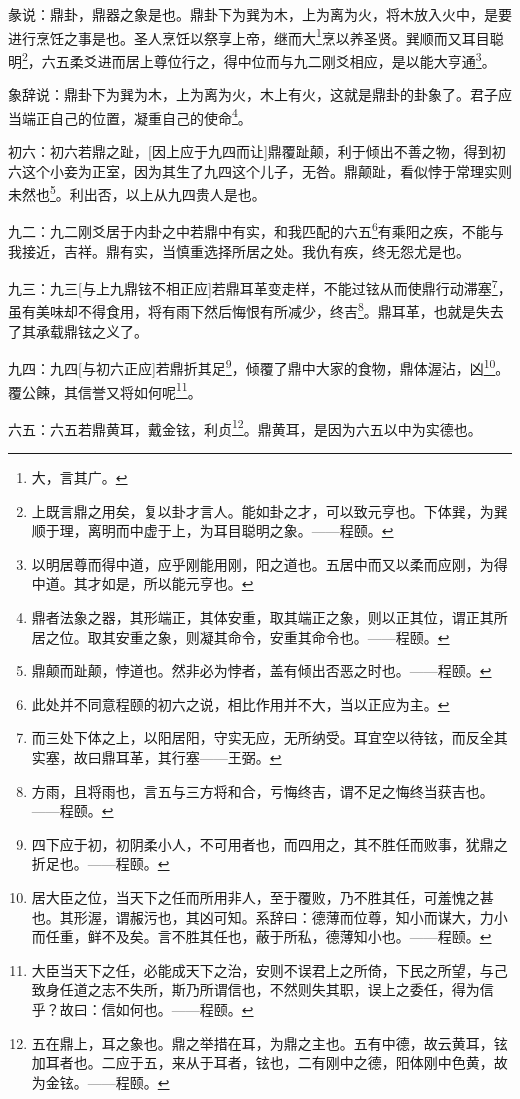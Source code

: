 \documentclass[12pt,oneside]{book}
\begin{document}
彖说：鼎卦，鼎器之象是也。鼎卦下为巽为木，上为离为火，将木放入火中，是要进行烹饪之事是也。圣人烹饪以祭享上帝，继而大\footnote{大，言其广。}烹以养圣贤。巽顺而又耳目聪明\footnote{上既言鼎之用矣，复以卦才言人。能如卦之才，可以致元亨也。下体巽，为巽顺于理，离明而中虚于上，为耳目聪明之象。——程颐。}，六五柔爻进而居上尊位行之，得中位而与九二刚爻相应，是以能大亨通\footnote{以明居尊而得中道，应乎刚能用刚，阳之道也。五居中而又以柔而应刚，为得中道。其才如是，所以能元亨也。}。

象辞说：鼎卦下为巽为木，上为离为火，木上有火，这就是鼎卦的卦象了。君子应当端正自己的位置，凝重自己的使命\footnote{鼎者法象之器，其形端正，其体安重，取其端正之象，则以正其位，谓正其所居之位。取其安重之象，则凝其命令，安重其命令也。——程颐。}。


初六：初六若鼎之趾，[因上应于九四而让]鼎覆趾颠，利于倾出不善之物，得到初六这个小妾为正室，因为其生了九四这个儿子，无咎。鼎颠趾，看似悖于常理实则未然也\footnote{鼎颠而趾颠，悖道也。然非必为悖者，盖有倾出否恶之时也。——程颐。}。利出否，以上从九四贵人是也。

九二：九二刚爻居于内卦之中若鼎中有实，和我匹配的六五\footnote{此处并不同意程颐的初六之说，相比作用并不大，当以正应为主。}有乘阳之疾，不能与我接近，吉祥。鼎有实，当慎重选择所居之处。我仇有疾，终无怨尤是也。

九三：九三[与上九鼎铉不相正应]若鼎耳革变走样，不能过铉从而使鼎行动滞塞\footnote{而三处下体之上，以阳居阳，守实无应，无所纳受。耳宜空以待铉，而反全其实塞，故曰鼎耳革，其行塞——王弼。}，虽有美味却不得食用，将有雨下然后悔恨有所减少，终吉\footnote{方雨，且将雨也，言五与三方将和合，亏悔终吉，谓不足之悔终当获吉也。——程颐。}。鼎耳革，也就是失去了其承载鼎铉之义了。

九四：九四[与初六正应]若鼎折其足\footnote{四下应于初，初阴柔小人，不可用者也，而四用之，其不胜任而败事，犹鼎之折足也。——程颐。}，倾覆了鼎中大家的食物，鼎体渥沾，凶\footnote{居大臣之位，当天下之任而所用非人，至于覆败，乃不胜其任，可羞愧之甚也。其形渥，谓赧污也，其凶可知。系辞曰：德薄而位尊，知小而谋大，力小而任重，鲜不及矣。言不胜其任也，蔽于所私，德薄知小也。——程颐。}。覆公餗，其信誉又将如何呢\footnote{大臣当天下之任，必能成天下之治，安则不误君上之所倚，下民之所望，与己致身任道之志不失所，斯乃所谓信也，不然则失其职，误上之委任，得为信乎？故曰：信如何也。——程颐。}。

六五：六五若鼎黄耳，戴金铉，利贞\footnote{五在鼎上，耳之象也。鼎之举措在耳，为鼎之主也。五有中德，故云黄耳，铉加耳者也。二应于五，来从于耳者，铉也，二有刚中之德，阳体刚中色黄，故为金铉。——程颐。}。鼎黄耳，是因为六五以中为实德也。
\end{document}
